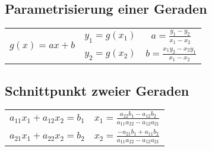 \documentclass[german]{latex4ei/latex4ei_sheet}
\begin{document}
\begin{sectionbox}
\subsection{Parametrisierung einer Geraden}
\begin{tabularx}{\columnwidth}{CCC}
 & $y_1 = g(x_1)$ & $a = \frac{y_1 - y_2}{x_1 - x_2}$\\
& $y_2 = g(x_2)$ & $b = \frac{x_1 y_2 - x_2 y_1}{x_1 - x_2}$
\end{tabularx}

\subsection{Schnittpunkt zweier Geraden}
\begin{tabularx}{\columnwidth}{CC}
$a_{11}x_1 + a_{12}x_2 = b_1$ & $x_1 = \frac{a_{22}b_1 - a_{12}b_2}{a_{11}a_{22}-a_{12}a_{21}}$\\
$a_{21}x_1 + a_{22}x_2 = b_2$ & $x_2 = \frac{-a_{21}b_1 + a_{11}b_2}{a_{11}a_{22}-a_{12}a_{21}}$
\end{tabularx}
\end{sectionbox}
\end{document}
